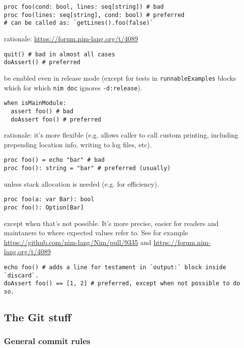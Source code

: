 \begin{verbatim}
proc foo(cond: bool, lines: seq[string]) # bad
proc foo(lines: seq[string], cond: bool) # preferred
# can be called as: `getLines().foo(false)`
\end{verbatim}

rationale: \url{https://forum.nim-lang.org/t/4089}

\begin{verbatim}
quit() # bad in almost all cases
doAssert() # preferred
\end{verbatim}

be enabled even in release mode (except for tests in
\texttt{runnableExamples} blocks which for which \texttt{nim\ doc}
ignores \texttt{-d:release}).

\begin{verbatim}
when isMainModule:
  assert foo() # bad
  doAssert foo() # preferred
\end{verbatim}

rationale: it's more flexible (e.g. allows caller to call custom
printing, including prepending location info, writing to log files,
etc).

\begin{verbatim}
proc foo() = echo "bar" # bad
proc foo(): string = "bar" # preferred (usually)
\end{verbatim}

unless stack allocation is needed (e.g. for efficiency).

\begin{verbatim}
proc foo(a: var Bar): bool
proc foo(): Option[Bar]
\end{verbatim}

except when that's not possible. It's more precise, easier for readers
and maintaners to where expected values refer to. See for example
\url{https://github.com/nim-lang/Nim/pull/9335} and
\url{https://forum.nim-lang.org/t/4089}

\begin{verbatim}
echo foo() # adds a line for testament in `output:` block inside `discard`.
doAssert foo() == [1, 2] # preferred, except when not possible to do so.
\end{verbatim}

\hypertarget{the-git-stuff}{%
\subsection{The Git stuff}\label{the-git-stuff}}

\hypertarget{general-commit-rules}{%
\subsubsection{General commit rules}\label{general-commit-rules}}


